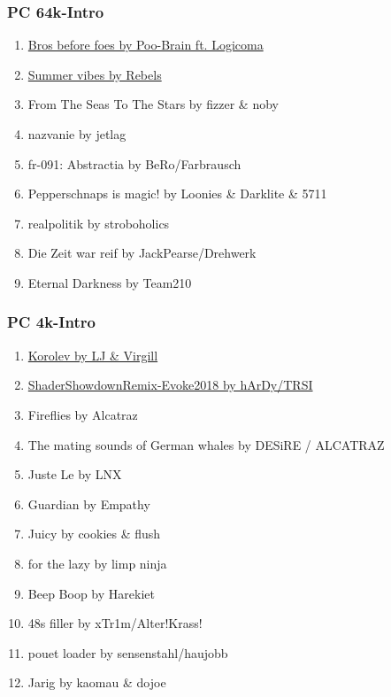 \documentclass{beamer}
\begin{document}
\begin{frame}
  \frametitle{PC 64k-Intro}
  \begin{enumerate}
  \item \href{https://www.pouet.net/prod.php?which=77682}{Bros before foes by Poo-Brain ft. Logicoma}
  \item \href{https://www.pouet.net/prod.php?which=77690}{Summer vibes by Rebels}
  \item From The Seas To The Stars by fizzer \& noby
  \item nazvanie by jetlag
  \item fr-091: Abstractia by BeRo/Farbrausch
  \item Pepperschnaps is magic! by Loonies \& Darklite \& 5711
  \item realpolitik by stroboholics
  \item Die Zeit war reif by JackPearse/Drehwerk
  \item Eternal Darkness by Team210
  \end{enumerate}
\end{frame}

\begin{frame}
  \frametitle{PC 4k-Intro}
  \begin{enumerate}
  \item \href{https://www.pouet.net/prod.php?which=77716}{Korolev by LJ \& Virgill}
  \item \href{https://www.pouet.net/prod.php?which=77689}{ShaderShowdownRemix-Evoke2018 by hArDy/TRSI}
  \item Fireflies by Alcatraz
  \item The mating sounds of German whales by DESiRE / ALCATRAZ
  \item Juste Le by LNX
  \item Guardian by Empathy
  \item Juicy by cookies \& flush
  \item for the lazy by limp ninja
  \item Beep Boop by Harekiet
  \item 48s filler by xTr1m/Alter!Krass!
  \item pouet loader by sensenstahl/haujobb
  \item Jarig by kaomau \& dojoe
  \end{enumerate}
\end{frame}
\end{document}
